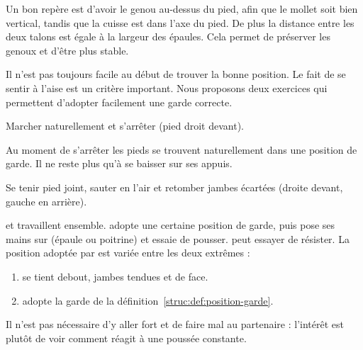 Un bon repère est d'avoir le genou au-dessus du pied, afin que le mollet soit bien vertical, tandis que la cuisse est dans l'axe du pied.
De plus la distance entre les deux talons est égale à la largeur des épaules.
Cela permet de préserver les genoux et d'être plus stable.

Il n'est pas toujours facile au début de trouver la bonne position.
Le fait de se sentir à l'aise est un critère important.
Nous proposons deux exercices qui permettent d'adopter facilement une garde correcte.


\begin{exercice}

Marcher naturellement et s'arrêter (pied droit devant).

Au moment de s'arrêter les pieds se trouvent naturellement dans une position de garde.
Il ne reste plus qu'à se baisser sur ses appuis.


\end{exercice}


\begin{exercice}

Se tenir pied joint, sauter en l'air et retomber jambes écartées (droite devant, gauche en arrière).


\end{exercice}


\begin{exercice}
\label{struc:ex:test-position}


\A et \D travaillent ensemble.
\D adopte une certaine position de garde, puis \A pose ses mains sur \D (épaule ou poitrine) et essaie de pousser.
\D peut essayer de résister.
La position adoptée par \D est variée entre les deux extrêmes :
\begin{enumerate}
	\item \D se tient debout, jambes tendues et de face.
	\item \D adopte la garde de la définition~\ref{struc:def:position-garde}.
\end{enumerate}

Il n'est pas nécessaire d'y aller fort et de faire mal au partenaire : l'intérêt est plutôt de voir comment \D réagit à une poussée constante.

\end{exercice}


